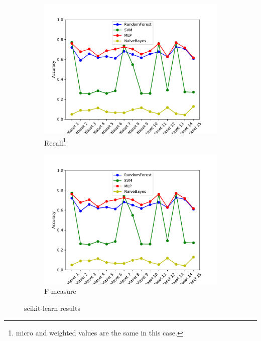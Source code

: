 \begin{figure}[H]\ContinuedFloat
\begin{subfigure}[t]{0.475\textwidth}
    \centering
    \includegraphics[page=4, width=\linewidth]{images/results_scikit.pdf}
    \caption{Recall\footnote{micro and weighted values are the same in this case.}}
    \label{fig:scikit_recall}
\end{subfigure}
\begin{subfigure}[t]{0.475\textwidth}
    \centering
    \includegraphics[page=2, width=\linewidth]{images/results_scikit.pdf}
    \caption{F-measure}
    \label{fig:scikit_f1}
\end{subfigure}
\caption{scikit-learn results}
\label{fig:scikit_results}
\end{figure}


